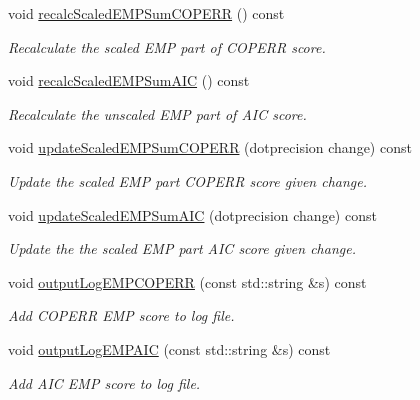 \begin{DoxyCompactItemize}
void \hyperlink{classsubpavings_1_1AdaptiveHistogram_a6456652ee831cee0ec4184440cd84ec9}{recalc\-Scaled\-E\-M\-P\-Sum\-C\-O\-P\-E\-R\-R} () const 
\begin{DoxyCompactList}\small\item\em \-Recalculate the scaled \-E\-M\-P part of \-C\-O\-P\-E\-R\-R score. \end{DoxyCompactList}\item 
void \hyperlink{classsubpavings_1_1AdaptiveHistogram_ab8a546d8d85be0ffac955f7886d5c7aa}{recalc\-Scaled\-E\-M\-P\-Sum\-A\-I\-C} () const 
\begin{DoxyCompactList}\small\item\em \-Recalculate the unscaled \-E\-M\-P part of \-A\-I\-C score. \end{DoxyCompactList}\item 
void \hyperlink{classsubpavings_1_1AdaptiveHistogram_a71122bfe1d3dfad1f2b55585326334ac}{update\-Scaled\-E\-M\-P\-Sum\-C\-O\-P\-E\-R\-R} (dotprecision change) const 
\begin{DoxyCompactList}\small\item\em \-Update the scaled \-E\-M\-P part \-C\-O\-P\-E\-R\-R score given change. \end{DoxyCompactList}\item 
void \hyperlink{classsubpavings_1_1AdaptiveHistogram_a79fe01c35fba2bbdb1df5e8eb1d3a78b}{update\-Scaled\-E\-M\-P\-Sum\-A\-I\-C} (dotprecision change) const 
\begin{DoxyCompactList}\small\item\em \-Update the the scaled \-E\-M\-P part \-A\-I\-C score given change. \end{DoxyCompactList}\item 
void \hyperlink{classsubpavings_1_1AdaptiveHistogram_ad2360173a5963ecbca37e0a78ce98879}{output\-Log\-E\-M\-P\-C\-O\-P\-E\-R\-R} (const std\-::string \&s) const 
\begin{DoxyCompactList}\small\item\em \-Add \-C\-O\-P\-E\-R\-R \-E\-M\-P score to log file. \end{DoxyCompactList}\item 
void \hyperlink{classsubpavings_1_1AdaptiveHistogram_a602b8b4081d3cae20308aa6644a83fa9}{output\-Log\-E\-M\-P\-A\-I\-C} (const std\-::string \&s) const 
\begin{DoxyCompactList}\small\item\em \-Add \-A\-I\-C \-E\-M\-P score to log file. \end{DoxyCompactList}\item 

\end{DoxyCompactItemize}
